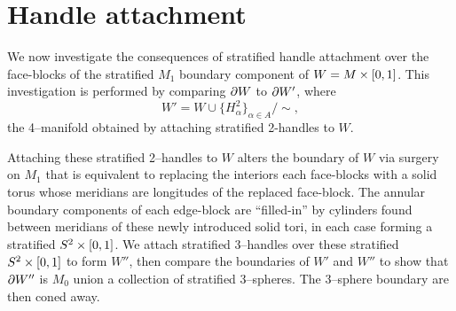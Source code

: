 \section{Handle attachment}

We now investigate the consequences of stratified handle attachment over the face-blocks of the stratified $M_1$ boundary component of $W=M\times[0,1]$.
This investigation is performed by comparing $\partial W$ to $\partial W'$, where
\[
	W' = W\cup\{H_\alpha^2\}_{\alpha\in A} / \sim,
\]
the 4--manifold obtained by attaching stratified 2-handles to $W$.

Attaching these stratified 2--handles to $W$ alters the boundary of $W$ via surgery on $M_1$ that is equivalent to replacing the interiors each face-blocks with a solid torus whose meridians are longitudes of the replaced face-block.
The annular boundary components of each edge-block are ``filled-in'' by cylinders found between meridians of these newly introduced solid tori, in each case forming a stratified $S^2\times[0,1]$.
We attach stratified 3--handles over these stratified $S^2\times[0,1]$ to form $W''$, then compare the boundaries of $W'$ and $W''$ to show that $\partial W''$ is $M_0$ union a collection of stratified 3--spheres.
The 3--sphere boundary are then coned away.
